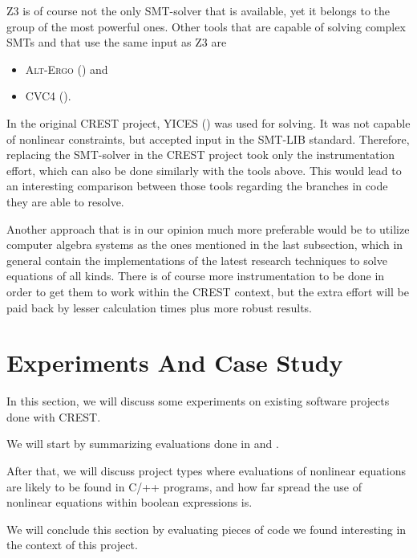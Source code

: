 \documentclass[oribibl]{llncs}
\begin{document}
\textsc{Z3} is of course not the only \textsc{SMT}-solver that is
available, yet it belongs to the group of the most powerful
ones. Other tools that are capable of solving complex SMTs and that use the
same input as \textsc{Z3} are
\begin{itemize}
  \item \textsc{Alt-Ergo} (\cite{bobotalt}) and
  \item \textsc{CVC4} (\cite{barrett2011cvc4}).
\end{itemize}

In the original \textsc{CREST} project, \textsc{YICES} (\cite{dutertre2006yices}) was used for
solving. It was not capable of nonlinear constraints, but accepted
input in the SMT-LIB standard. Therefore, replacing the SMT-solver in
the \textsc{CREST} project took only the instrumentation effort, which
can also be done similarly with the tools above. This would lead to an
interesting comparison between those tools regarding the branches in
code they are able to resolve.

Another approach that is in our opinion much more preferable would be
to utilize computer algebra systems as the ones mentioned in the last subsection, which in general contain the
implementations of the latest research techniques to solve equations
of all kinds. There is of course more instrumentation to be done in
order to get them to work within the \textsc{CREST} context, but the
extra effort will be paid back by lesser calculation times plus more
robust results.


\section{Experiments And Case Study}
\label{sctn:Experiments}

In this section, we will discuss some experiments on existing software
projects done with
\textsc{CREST}.

We will start by summarizing evaluations done in \cite{CREST} and
\cite{CRESTZ3}.

After that, we will discuss project types where evaluations of
nonlinear equations are likely to be found in \textsc{C/++} programs, and how far spread the use
of nonlinear equations within boolean expressions is.

We will conclude this section by evaluating pieces of code we found
interesting in the context of this project.
\end{document}

